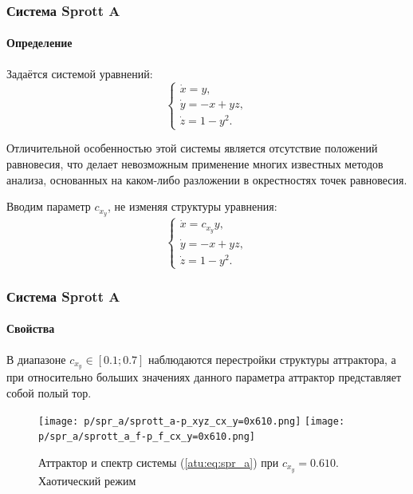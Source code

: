 \documentclass[10pt,utf8]{beamer}
\begin{document}

\begin{frame}
  \frametitle{Система Sprott A}
  \framesubtitle{Определение}

  Задаётся системой уравнений:
  \begin{equation}
    \begin{cases}
      \dot{x} =  y, \\
      \dot{y} = -x + yz, \\
      \dot{z} =  1 - y^2.
    \end{cases}
    \label{atu:eq:spr_a_orig}
  \end{equation}

  Отличительной особенностью
  этой системы является отсутствие положений равновесия, что делает
  невозможным применение многих известных методов анализа, основанных на
  каком-либо разложении в окрестностях точек равновесия.

  Вводим параметр $c_{x_y}$, не изменяя структуры уравнения:
  \begin{equation}
    \begin{cases}
      \dot{x} =  c_{x_y} y, \\
      \dot{y} = -x + yz, \\
      \dot{z} =  1 - y^2.
    \end{cases}
    \label{atu:eq:spr_a}
  \end{equation}
  \end{frame}


\begin{frame}
  \frametitle{Система Sprott A}
  \framesubtitle{Свойства}

  В диапазоне $c_{x_y} \in [0.1 ; 0.7] $
  наблюдаются перестройки структуры аттрактора, а при относительно больших
  значениях данного параметра аттрактор представляет собой полый тор.

  \begin{figure}[htb!]
  \centerline{
    \texttt{[image: p/spr\_a/sprott\_a-p\_xyz\_cx\_y=0x610.png]}
    \texttt{[image: p/spr\_a/sprott\_a\_f-p\_f\_cx\_y=0x610.png]}
  }
  \caption{Аттрактор и спектр системы (\ref{atu:eq:spr_a}) при $ c_{x_y} =0.610 $.
    Хаотический режим
  }
  \label{atu:f:spr_a_p_0610}
  \end{figure}

\end{frame}
\end{document}
